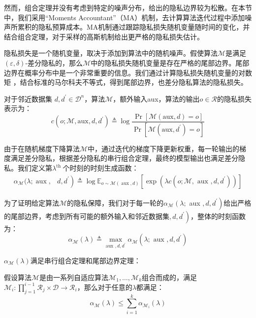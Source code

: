 然而，组合定理并没有考虑到特定的噪声分布，给出的隐私边界较为松散。在本节中，我们采用“Moments Accountant”（MA）机制，去计算算法迭代过程中添加噪声所累积的隐私预算成本。MA机制通过跟踪隐私损失随机变量随时间的变化，并结合组合定理，对于采样的高斯机制给出更严格的隐私损失估计。

隐私损失是一个随机变量，取决于添加到算法中的随机噪声。假使算法$\mathcal{M}$是满足 $(\varepsilon, \delta)$-差分隐私的，那么$\mathcal{M}$中的隐私损失随机变量是存在严格的尾部边界。尾部边界在概率分布中是一个非常重要的信息。我们通过计算隐私损失随机变量的对数矩
，结合标准的马尔科夫不等式，得到尾部边界，也差分隐私算法的隐私损失。

对于邻近数据集 $d, d^{\prime} \in \mathcal{D}^{n}$，算法$\mathcal{M}$，额外输入aux，算法的输出$o \in \mathcal{R}$的隐私损失表示为：
$$
c\left(o ; \mathcal{M}, \mathrm{aux}, d, d^{\prime}\right) \triangleq \log \frac{\operatorname{Pr}[\mathcal{M}(\mathrm{aux}, d)=o]}{\operatorname{Pr}\left[\mathcal{M}\left(\mathrm{aux}, d^{\prime}\right)=o\right]}
$$

由于在随机梯度下降算法$\mathcal{M}$中，通过迭代的梯度下降更新权重，每一轮输出的梯度满足差分隐私，根据差分隐私的串行组合定理，最终的模型输出也满足差分隐私。我们定义第$\lambda^{\text {th }}$个时刻的时刻生成函数：
$$
\begin{aligned}
\alpha_{\mathcal{M}}(\lambda ; \operatorname{aux},&\left.d, d^{\prime}\right) \triangleq\log \mathbb{E}_{o \sim \mathcal{M}(\operatorname{aux}, d)}\left[\exp \left(\lambda c\left(o ; \mathcal{M}, \text { aux }, d, d^{\prime}\right)\right)\right]
\end{aligned}
$$

为了证明给定算法$\mathcal{M}$的隐私保障，我们对于每一轮的$\alpha_{\mathcal{M}}\left(\lambda ;\right.$ aux $\left., d, d^{\prime}\right)$给出严格的尾部边界，考虑到所有可能的额外输入和邻近数据集$\left., d, d^{\prime}\right)$，整体的时刻函数为：
$$
\alpha_{\mathcal{M}}(\lambda) \triangleq \max _{\text {aux }, d, d^{\prime}} \alpha_{\mathcal{M}}\left(\lambda ; \text { aux }, d, d^{\prime}\right)
$$

$\alpha_{\mathcal{M}}(\lambda)$满足串行组合定理和尾部边界定理：

\begin{theorem}[时刻函数的串行组合]\label{时刻函数的串行组合}
假设算法$\mathcal{M}$是由一系列自适应算法$\mathcal{M}_{1}, \ldots, \mathcal{M}_{k}$组合而成的，满足$\mathcal{M}_{i}: \prod_{j=1}^{i-1} \mathcal{R}_{j} \times \mathcal{D} \rightarrow \mathcal{R}_{i}$，那么对于任意的$\lambda$都满足：
$$
\alpha_{\mathcal{M}}(\lambda) \leq \sum_{i=1}^{k} \alpha_{\mathcal{M}_{i}}(\lambda)
$$
\end{theorem}


